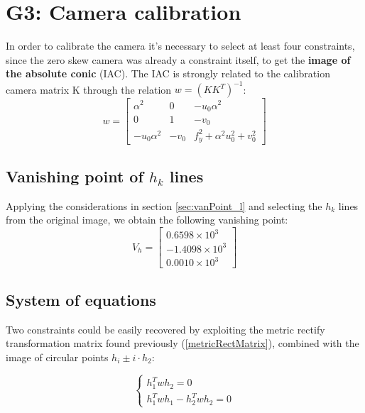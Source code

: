 \section{G3: Camera calibration}
In order to calibrate the camera it's necessary to select at least four constraints, since the zero skew camera was already a constraint itself, to get the \textbf{image of the absolute conic} (IAC). The IAC is strongly related to the calibration camera matrix K through the relation $w = (KK^T)^{-1}$:
\begin{equation}
    w = 
    \begin{bmatrix}
        \alpha^2 & 0 & -u_0\alpha^2 \\
        0 & 1 & -v_0 \\
        -u_0\alpha^2 & -v_0 & f_y^2 + \alpha^2u_0^2+v_0^2
    \end{bmatrix}
\end{equation}

\subsection[Vanishing point of \textit{h} lines]{Vanishing point of $h_k$ lines}
Applying the considerations in section \ref{sec:vanPoint_l} and selecting the $h_k$ lines from the original image, we obtain the following vanishing point:
\begin{equation} \label{eq: vanPoint_h}
    V_h = 
    \begin{bmatrix}
        0.6598 \times 10^{3} \\
        -1.4098 \times 10^{3} \\
        0.0010 \times 10^{3}
    \end{bmatrix}
\end{equation}

\subsection{System of equations}
Two constraints could be easily recovered by exploiting the metric rectify transformation matrix found previously (\ref{metricRectMatrix}), combined with the image of circular points $h_i \pm i \cdot h_2$:

\begin{equation}
    \begin{cases}
        h_1^Twh_2 = 0 \\
        h_1^Twh_1 - h_2^Twh_2 = 0    
    \end{cases}
\end{equation}

